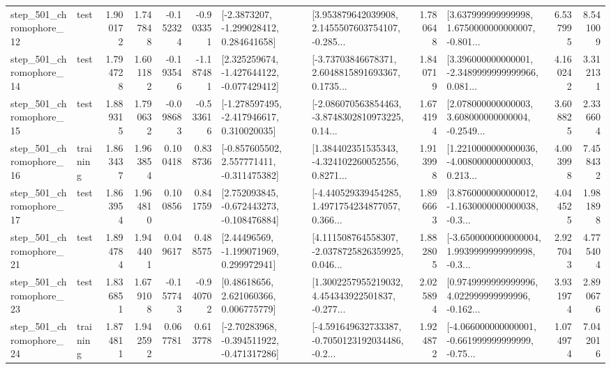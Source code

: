 \begin{tabular}{llrrrrllrlrr}
  step\_501\_chromophore\_12 &      test &      1.900172 &    1.747848 &     -0.152324 & -0.903351 &     [-2.3873207, -1.299028412, 0.284641658] &  [3.953879642039908, 2.1455507603754107, -0.285... &       1.780648 &  [3.637999999999998, 1.6750000000000007, -0.801... &            6.537995 &          8.541009 \\
  step\_501\_chromophore\_14 &      test &      1.794728 &    1.601182 &     -0.193546 & -1.187481 &   [2.325259674, -1.427644122, -0.077429412] &  [-3.73703846678371, 2.6048815891693367, 0.1735... &       1.840719 &  [3.396000000000001, -2.3489999999999966, 0.081... &            4.160242 &          3.312131 \\
  step\_501\_chromophore\_15 &      test &      1.889315 &    1.790632 &     -0.098683 & -0.533616 &   [-1.278597495, -2.417946617, 0.310020035] &  [-2.086070563854463, -3.8748302810973225, 0.14... &       1.674194 &  [2.078000000000003, 3.608000000000004, -0.2549... &            3.608825 &          2.336604 \\
  step\_501\_chromophore\_16 &  training &      1.863437 &    1.963854 &      0.100418 &  0.838736 &   [-0.857605502, 2.557771411, -0.311475382] &  [1.384402351535343, -4.324102260052556, 0.8271... &       1.913998 &  [1.2210000000000036, -4.008000000000003, 0.213... &            4.003998 &          7.458432 \\
  step\_501\_chromophore\_17 &      test &      1.863954 &    1.964810 &      0.100856 &  0.841759 &   [2.752093845, -0.672443273, -0.108476884] &  [-4.440529339454285, 1.4971754234877057, 0.366... &       1.896663 &  [3.8760000000000012, -1.1630000000000038, -0.3... &            4.044525 &          1.981898 \\
  step\_501\_chromophore\_21 &      test &      1.894784 &    1.944401 &      0.049617 &  0.488575 &     [2.44496569, -1.199071969, 0.299972941] &  [4.111508764558307, -2.0378725826359925, 0.046... &       1.882805 &  [-3.6500000000000004, 1.9939999999999998, -0.3... &            2.927043 &          4.775404 \\
  step\_501\_chromophore\_23 &      test &      1.836851 &    1.679108 &     -0.157743 & -0.940702 &      [0.48618656, 2.621060366, 0.006775779] &  [1.3002257955219032, 4.454343922501837, -0.277... &       2.025894 &  [0.9749999999999996, 4.022999999999996, -0.162... &            3.931974 &          2.890676 \\
  step\_501\_chromophore\_24 &  training &      1.874811 &    1.942592 &      0.067781 &  0.613778 &   [-2.70283968, -0.394511922, -0.471317286] &  [-4.591649632733387, -0.7050123192034486, -0.2... &       1.924872 &  [-4.066000000000001, -0.661999999999999, -0.75... &            1.074974 &          7.042016 \\

\end{tabular}
